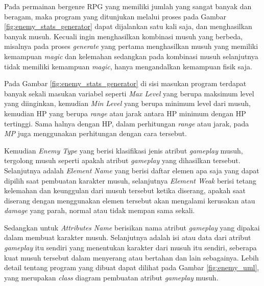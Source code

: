 Pada permainan bergenre RPG yang memiliki jumlah yang sangat banyak dan beragam, maka program yang ditunjukan melalui proses pada Gambar \ref{fig:enemy_stats_generator} dapat dijalankan satu kali saja, dan menghasilkan banyak musuh. Kecuali ingin menghasilkan kombinasi musuh yang berbeda, misalnya pada proses \textit{generate} yang pertama menghasilkan musuh yang memiliki kemampuan \textit{magic} dan kelemahan sedangkan pada kombinasi musuh selanjutnya tidak memiliki kemampuan \textit{magic}, hanya mengandalkan kemampuan fisik saja.
\vspace{1ex}

Pada Gambar \ref{fig:enemy_stats_generator} di sisi masukan program terdapat banyak sekali masukan variabel seperti \textit{Max Level} yang berupa maksimum level yang diinginkan, kemudian \textit{Min Level} yang berupa minimum level dari musuh, kemudian HP yang berupa \textit{range} atau jarak antara HP minimum dengan HP tertinggi. Sama halnya dengan HP, dalam perhitungan \textit{range} atau jarak, pada \textit{MP} juga menggunakan perhitungan dengan cara tersebut. 
\vspace{1ex}

Kemudian \textit{Enemy Type} yang berisi klasifikasi jenis atribut \textit{gameplay} musuh, tergolong musuh seperti apakah atribut \textit{gameplay} yang dihasilkan tersebut. Selanjutnya adalah \textit{Element Name} yang berisi daftar elemen apa saja yang dapat dipilih saat pembuatan karakter musuh, selanjutnya \textit{Element Weak} berisi tetang kelemahan dan keunggulan dari musuh tersebut ketika diserang, apakah saat diserang dengan menggunakan elemen tersebut akan mengalami kerusakan atau \textit{damage} yang parah, normal atau tidak mempan sama sekali. 
\vspace{1ex}

Sedangkan untuk \textit{Attributes Name} berisikan nama atribut \textit{gameplay} yang dipakai dalam membuat karakter musuh. Selanjutnya adalah isi atau data dari atribut \textit{gameplay} itu sendiri yang menentukan karakter dari musuh itu sendiri, seberapa kuat musuh tersebut dalam menyerang atau bertahan dan lain sebagainya. Lebih detail tentang program yang dibuat dapat dilihat pada Gambar \ref{fig:enemy_uml}, yang merupakan \textit{class} diagram pembuatan atribut \textit{gameplay} musuh.
\vspace{1ex}


